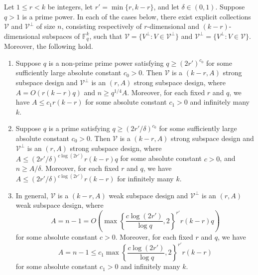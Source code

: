 \documentclass[11pt]{article}
\newcommand{\F}{\mathbb{F}}
\begin{document}
\begin{theorem}\label{thm:designbound}

Let $1\le r<k$ be integers, let $r'=\min\{r,k-r\}$, and let $\delta\in(0,1)$.
Suppose $q>1$ is a prime power. In each of the cases below, there exist explicit collections
$\mathcal{V}$ and $\mathcal{V}^\perp$ of size $n$, consisting respectively of $r$-dimensional
and $(k-r)$-dimensional subspaces of $\F_q^k$, such that
$\mathcal{V}=\{V^\perp: V\in\mathcal{V}^\perp\}$ and $\mathcal{V}^\perp=\{V^\perp: V\in\mathcal{V}\}$.
Moreover, the following hold.

\begin{enumerate}
\item\label{item:nonprime}
Suppose $q$ is a non-prime prime power satisfying
$q\ge (2r')^{c_0}$ for some sufficiently large absolute constant $c_0>0$.
Then $\mathcal{V}$ is a $(k-r,A)$ strong subspace design and
$\mathcal{V}^\perp$ is an $(r,A)$ strong subspace design, where
$A=O(r(k-r)q)$ and $n\ge q^{1/4}A$.
Moreover, for each fixed $r$ and $q$, we have
$A\le c_1r(k-r)$ for some absolute constant $c_1>0$ and infinitely many $k$.

\item\label{item:prime}
Suppose $q$ is a prime satisfying
$q\ge (2r'/\delta)^{c_0}$ for some sufficiently large absolute constant $c_0>0$.
Then $\mathcal{V}$ is a $(k-r,A)$ strong subspace design and
$\mathcal{V}^\perp$ is an $(r,A)$ strong subspace design, where
$A\le (2r'/\delta)^{c\log(2r')}r(k-r)q$
for some absolute constant $c>0$, and $n\ge A/\delta$.
Moreover, for each fixed $r$ and $q$, we have $A\le (2r'/\delta)^{c\log(2r')}r(k-r)$
for infinitely many $k$.

\item\label{item:small}
In general, $\mathcal{V}$ is a $(k-r,A)$ weak subspace design and
$\mathcal{V}^\perp$ is an $(r,A)$ weak subspace design, where
\[
A=n-1=
O\left(
\max\left\{\frac{c\log(2r')}{\log q},2\right\}^{r'}
r(k-r)q
\right)
\]
for some absolute constant $c>0$.
Moreover, for each fixed $r$ and $q$, we have
\[
A=n-1\le
c_1
\max\left\{\frac{c\log(2r')}{\log q},2\right\}^{r'}
r(k-r)
\]
for some absolute constant $c_1>0$ and infinitely many $k$.
\end{enumerate}
\end{theorem}
\end{document}
